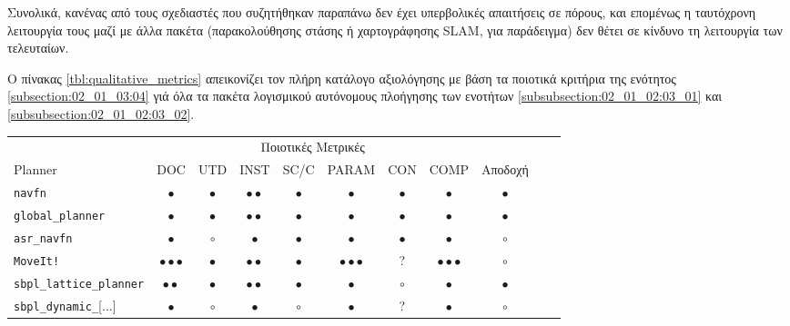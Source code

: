 Συνολικά, κανένας από τους σχεδιαστές που συζητήθηκαν παραπάνω δεν έχει
υπερβολικές απαιτήσεις σε πόρους, και επομένως η ταυτόχρονη λειτουργία τους
μαζί με άλλα πακέτα (παρακολούθησης στάσης ή χαρτογράφησης SLAM, για παράδειγμα)
δεν θέτει σε κίνδυνο τη λειτουργία των τελευταίων.

Ο πίνακας \ref{tbl:qualitative_metrics} απεικονίζει τον πλήρη κατάλογο
αξιολόγησης με βάση τα ποιοτικά κριτήρια της ενότητος
\ref{subsection:02_01_03:04} γιά όλα τα πακέτα λογισμικού αυτόνομους πλοήγησης
των ενοτήτων \ref{subsubsection:02_01_02:03_01} και
\ref{subsubsection:02_01_02:03_02}.

\begin{table*}\hspace{-1cm}
\renewcommand{\arraystretch}{1.3}
\begin{tabular}{lccccccccc|c}
  & \multicolumn{7}{c}{Ποιοτικές Μετρικές} \\
  \cline{2-8}
  Planner                            & DOC                       & UTD         & INST              & SC/C      & PARAM                   & CON              & COMP                    & Αποδοχή      \\ \toprule
  \texttt{navfn}                     & $\bullet$                 & $\bullet$   & $\bullet\bullet$  & $\bullet$ & $\bullet$               & $\bullet$        & $\bullet$               & $\bullet$    \\
  \texttt{global\_planner}           & $\bullet$                 & $\bullet$   & $\bullet\bullet$  & $\bullet$ & $\bullet$               & $\bullet$        & $\bullet$               & $\bullet$    \\
  \texttt{asr\_navfn}                & $\bullet$                 & $\circ$     & $\bullet$         & $\bullet$ & $\bullet$               & $\bullet$        & $\bullet$               & $\circ$      \\
  \texttt{MoveIt!}                   & $\bullet\bullet\bullet$   & $\bullet$   & $\bullet\bullet$  & $\bullet$ & $\bullet\bullet\bullet$ & ?                & $\bullet\bullet\bullet$ & $\circ$      \\
  \texttt{sbpl\_lattice\_planner}    & $\bullet\bullet$          & $\bullet$   & $\bullet\bullet$  & $\bullet$ & $\bullet$               & $\circ$          & $\bullet$               & $\bullet$    \\
  \texttt{sbpl\_dynamic\_}[$\dots$]  & $\bullet$                 & $\circ$     & $\bullet$         & $\circ$   & $\bullet$               & ?                & $\bullet$               & $\circ$      \\

\end{tabular}
\end{table*}
